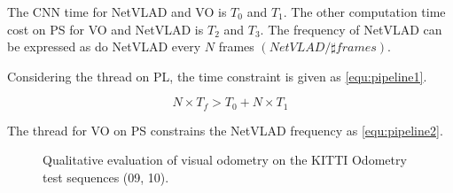 The CNN time for NetVLAD and VO is $T_{0}$ and $T_{1}$. The other computation time cost on PS for VO and NetVLAD is $T_{2}$ and $T_{3}$. The frequency of NetVLAD can be expressed as do NetVLAD every $N$ frames $(NetVLAD/\sharp frames)$.



Considering the thread on PL, the time constraint is given as \cref{equ:pipeline1}. 

\begin{equation}
    N \times T_{f} > T_{0} + N \times T_{1}
    \label{equ:pipeline1}
\end{equation}

The thread for VO on PS constrains the NetVLAD frequency as \cref{equ:pipeline2}.


\begin{figure}[thb]
    \centering  
    \caption{Qualitative evaluation of visual odometry on the KITTI Odometry test sequences (09, 10).}
    \label{fig:VO}
  \end{figure}

